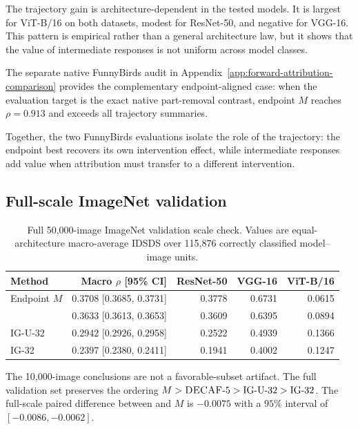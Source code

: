 The trajectory gain is architecture-dependent in the tested models. It is largest for ViT-B/16 on both datasets, modest for ResNet-50, and negative for VGG-16. This pattern is empirical rather than a general architecture law, but it shows that the value of intermediate responses is not uniform across model classes.

The separate native FunnyBirds audit in
Appendix~\ref{app:forward-attribution-comparison} provides the complementary
endpoint-aligned case: when the evaluation target is the exact native
part-removal contrast, endpoint $M$ reaches $\rho=0.913$ and exceeds all
trajectory summaries.

Together, the two FunnyBirds evaluations isolate the role of the trajectory:
the endpoint best recovers its own intervention effect, while intermediate
responses add value when attribution must transfer to a different intervention.

\subsection{Full-scale ImageNet validation}

\begin{table}[t]
\centering
\caption{Full 50,000-image ImageNet validation scale check. Values are equal-architecture macro-average IDSDS over 115,876 correctly classified model--image units.}
\label{tab:idsds-full50k}
\footnotesize
\setlength{\tabcolsep}{4pt}
\begin{tabular}{lrrrr}
\toprule
Method & Macro $\rho$ [95\% CI] & ResNet-50 & VGG-16 & ViT-B/16 \\
\midrule
Endpoint $M$ & 0.3708 [0.3685, 0.3731] & 0.3778 & 0.6731 & 0.0615 \\
\decaf-5 & 0.3633 [0.3613, 0.3653] & 0.3609 & 0.6395 & 0.0894 \\
IG-U-32 & 0.2942 [0.2926, 0.2958] & 0.2522 & 0.4939 & 0.1366 \\
IG-32 & 0.2397 [0.2380, 0.2411] & 0.1941 & 0.4002 & 0.1247 \\
\bottomrule
\end{tabular}
\end{table}

The 10,000-image conclusions are not a favorable-subset artifact. The full validation set preserves the ordering $M > \textsc{DECAF}\text{-}5 > \mathrm{IG\text{-}U\text{-}32} > \mathrm{IG\text{-}32}$. The full-scale paired difference between  and $M$ is $-0.0075$ with a $95\%$ interval of $[-0.0086,-0.0062]$.

